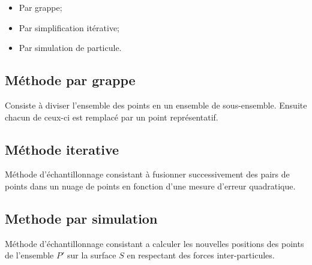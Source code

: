 \begin{itemize}
  \item Par grappe;
  \item Par simplification itérative;
  \item Par simulation de particule.
\end{itemize}

\subsection{Méthode par grappe}
\begin{definition}
  Consiste à diviser l'ensemble des points en un ensemble de sous-ensemble. Ensuite chacun de ceux-ci est remplacé par un point représentatif.
\end{definition}

\subsection*{Méthode iterative}
\begin{definition}
  Méthode d'échantillonnage consistant à fusionner successivement des pairs de points dans un nuage de points en fonction d'une mesure d'erreur quadratique.
\end{definition}

\subsection*{Methode par simulation}
\begin{definition}
  Méthode d'échantillonnage consistant a calculer les nouvelles positions des points de l'ensemble $P'$ sur la surface $S$ en respectant des forces inter-particules.
\end{definition}